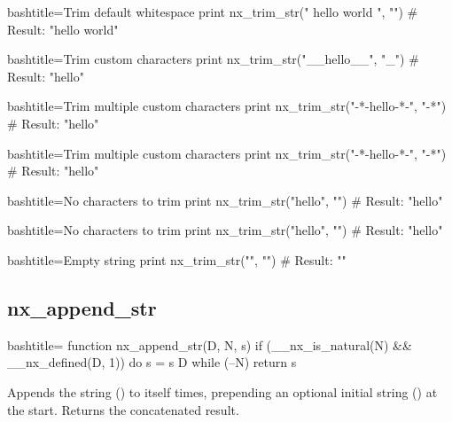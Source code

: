 \begin{NexCodeBox}{bash}{title={Trim default whitespace}}
	print nx_trim_str("   hello world	", "")
	# Result: "hello world"
\end{NexCodeBox}

\begin{NexCodeBox}{bash}{title={Trim custom characters}}
	print nx_trim_str("__hello__", "_")
	# Result: "hello"
\end{NexCodeBox}

\begin{NexCodeBox}{bash}{title={Trim multiple custom characters}}
	print nx_trim_str("-*-hello-*-", "-*")
	# Result: "hello"
\end{NexCodeBox}

\begin{NexCodeBox}{bash}{title={Trim multiple custom characters}}
	print nx_trim_str("-*-hello-*-", "-*")
	# Result: "hello"
\end{NexCodeBox}

\begin{NexCodeBox}{bash}{title={No characters to trim}}
	print nx_trim_str("hello", "")
	# Result: "hello"
\end{NexCodeBox}

\begin{NexCodeBox}{bash}{title={No characters to trim}}
	print nx_trim_str("hello", "")
	# Result: "hello"
\end{NexCodeBox}

\begin{NexCodeBox}{bash}{title={Empty string}}
	print nx_trim_str("", "")
	# Result: ""
\end{NexCodeBox}

\newpage
\subsection{nx_append_str}
\label{nx_append_str}
\begin{NexCodeBox}{bash}{title={}}
function nx_append_str(D, N, s) {
	if (__nx_is_natural(N) && __nx_defined(D, 1)) {
		do {
			s = s D
		} while (--N)
		return s
	}
}
\end{NexCodeBox}

\begin{NexMainBox}
	\begin{NexMainBox}
		Appends the string () to itself  times, prepending an optional initial string () at the start. Returns the concatenated result.
	\end{NexMainBox}
	\begin{NexMainBox}
		\begin{NexListDark}
		\end{NexListDark}
	\end{NexMainBox}
\end{NexMainBox}

